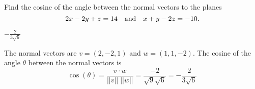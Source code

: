 \documentclass{ximera}
\author{Marty Golubitsky}
\begin{document}

\begin{exercise}\label{c2.2.85}

Find the cosine of the angle between the normal vectors to the planes 
\[
2x - 2y + z = 14 \quad\mbox{and}\quad x + y - 2z = -10.
\]

  
\begin{solution}

\ans $-\frac{2}{3\sqrt{6}}$

\soln The normal vectors are $v = (2, -2, 1)$ and $w = ( 1, 1 , -2)$.  The cosine of the angle $\theta$ between the normal vectors is 
\[
\cos(\theta) = \frac{v\cdot w}{||v||\; ||w||} = \frac{-2}{\sqrt{9}\sqrt{6}} = -\frac{2}{3\sqrt{6}}
\]

\end{solution}
\end{exercise}
\end{document}
